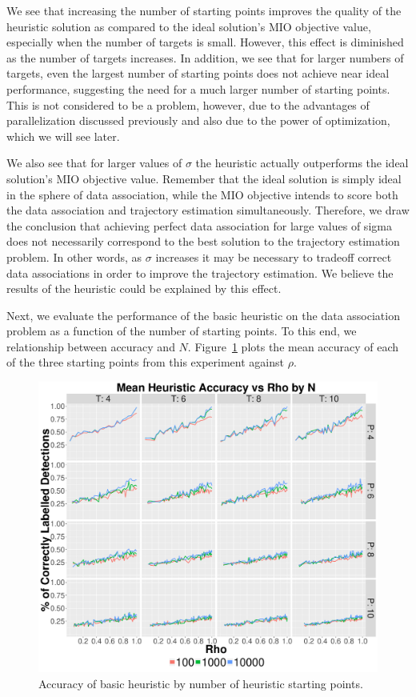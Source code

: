We see that increasing the number of starting points improves the quality of the heuristic solution as compared to the ideal solution's MIO objective value, especially when the number of targets is small. However, this effect is diminished as the number of targets increases. In addition, we see that for larger numbers of targets, even the largest number of starting points does not achieve near ideal performance, suggesting the need for a much larger number of starting points. This is not considered to be a problem, however, due to the advantages of parallelization discussed previously and also due to the power of optimization, which we will see later. 

We also see that for larger values of $\sigma$ the heuristic actually outperforms the ideal solution's MIO objective value. Remember that the ideal solution is simply ideal in the sphere of data association, while the MIO objective intends to score both the data association and trajectory estimation simultaneously. Therefore, we draw the conclusion that achieving perfect data association for large values of sigma does not necessarily correspond to the best solution to the trajectory estimation problem. In other words, as $\sigma$ increases it may be necessary to tradeoff correct data associations in order to improve the trajectory estimation. We believe the results of the heuristic could be explained by this effect.

Next, we evaluate the performance of the basic heuristic on the data association problem as a function of the number of starting points. To this end, we relationship between accuracy and $N$. Figure~\ref{fig:Basic_Heuristic_Accuracy} plots the mean accuracy of each of the three starting points from this experiment against $\rho$. 

\begin{figure}[ht]
  \centering
  \includegraphics[width=\columnwidth]{../Figures/Basic_Heuristic_Accuracy}
  \caption{Accuracy of basic heuristic by number of heuristic starting points.}
  \label{fig:Basic_Heuristic_Accuracy}
\end{figure}

